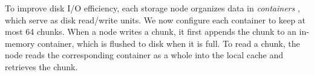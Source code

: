 

To improve disk I/O efficiency, each storage node organizes data in 
{\em containers} \cite{zhu08}, which serve as disk read/write units.  We now
configure each container to keep at most 64 chunks.  When a node writes a
chunk, it first appends the chunk to an in-memory container, which is flushed
to disk when it is full.  To read a chunk, the node reads the corresponding
container as a whole into the local cache and retrieves the chunk. 


